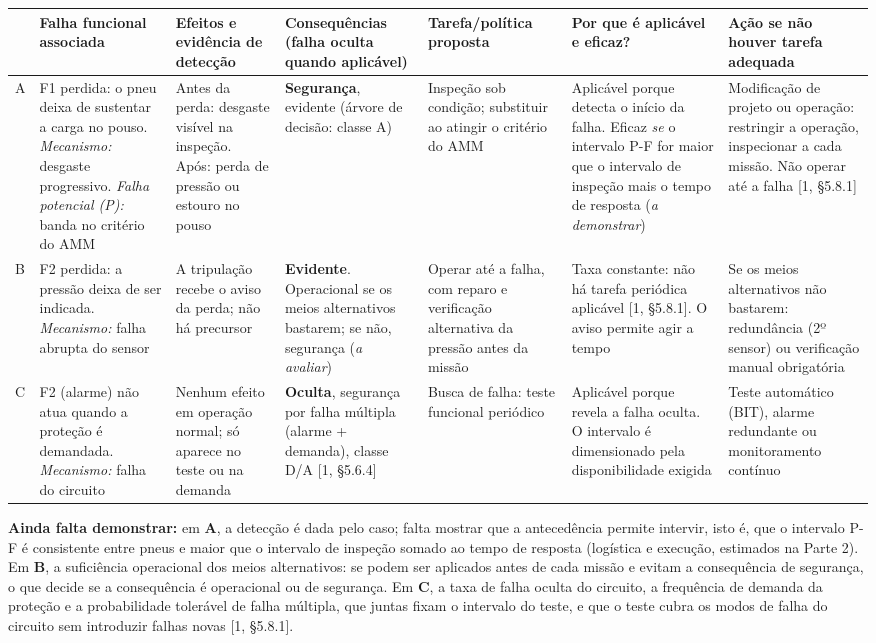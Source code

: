 \documentclass[11pt,a4paper]{article}
\begin{document}
{\small\setlength{\tabcolsep}{2.5pt}
\begin{tabularx}{\linewidth}{@{}p{0.35cm}YYYYYY@{}}
\toprule
& Falha funcional associada & Efeitos e evidência de detecção & Consequências (falha oculta quando aplicável) & Tarefa/política proposta & Por que é aplicável e eficaz? & Ação se não houver tarefa adequada\\
\midrule
A & F1 perdida: o pneu deixa de sustentar a carga no pouso. \emph{Mecanismo:} desgaste progressivo. \emph{Falha potencial (P):} banda no critério do AMM & Antes da perda: desgaste visível na inspeção. Após: perda de pressão ou estouro no pouso & \textbf{Segurança}, evidente (árvore de decisão: classe A) & Inspeção sob condição; substituir ao atingir o critério do AMM & Aplicável porque detecta o início da falha. Eficaz \emph{se} o intervalo P-F for maior que o intervalo de inspeção mais o tempo de resposta (\emph{a demonstrar}) & Modificação de projeto ou operação: restringir a operação, inspecionar a cada missão. Não operar até a falha [1, §5.8.1]\\
B & F2 perdida: a pressão deixa de ser indicada. \emph{Mecanismo:} falha abrupta do sensor & A tripulação recebe o aviso da perda; não há precursor & \textbf{Evidente}. Operacional se os meios alternativos bastarem; se não, segurança (\emph{a avaliar}) & Operar até a falha, com reparo e verificação alternativa da pressão antes da missão & Taxa constante: não há tarefa periódica aplicável [1, §5.8.1]. O aviso permite agir a tempo & Se os meios alternativos não bastarem: redundância (2º sensor) ou verificação manual obrigatória\\
C & F2 (alarme) não atua quando a proteção é demandada. \emph{Mecanismo:} falha do circuito & Nenhum efeito em operação normal; só aparece no teste ou na demanda & \textbf{Oculta}, segurança por falha múltipla (alarme + demanda), classe D/A [1, §5.6.4] & Busca de falha: teste funcional periódico & Aplicável porque revela a falha oculta. O intervalo é dimensionado pela disponibilidade exigida & Teste automático (BIT), alarme redundante ou monitoramento contínuo\\
\bottomrule
\end{tabularx}}

\textbf{Ainda falta demonstrar:} em \textbf{A}, a detecção é dada pelo caso; falta mostrar que a antecedência permite intervir, isto é, que o intervalo P-F é consistente entre pneus e maior que o intervalo de inspeção somado ao tempo de resposta (logística e execução, estimados na Parte 2). Em \textbf{B}, a suficiência operacional dos meios alternativos: se podem ser aplicados antes de cada missão e evitam a consequência de segurança, o que decide se a consequência é operacional ou de segurança. Em \textbf{C}, a taxa de falha oculta do circuito, a frequência de demanda da proteção e a probabilidade tolerável de falha múltipla, que juntas fixam o intervalo do teste, e que o teste cubra os modos de falha do circuito sem introduzir falhas novas [1, §5.8.1].
\end{document}
